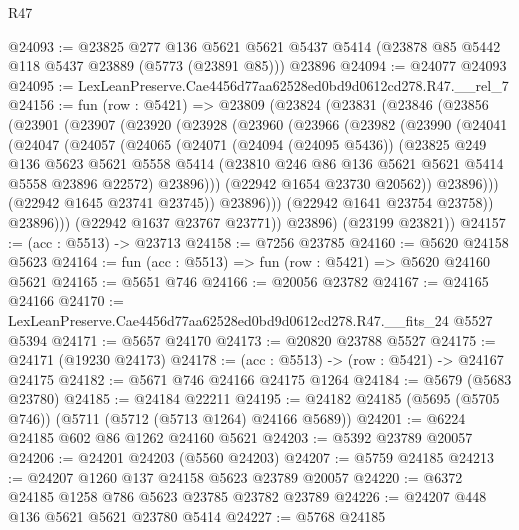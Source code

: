 \begin{lexlean}{R47}
\begin{coremodule}
@24093 := @23825
    @277
    @136
    @5621
    @5621
    @5437
    @5414
    (@23878 @85 @5442 @118 @5437 @23889 (@5773 (@23891 @85)))
    @23896
@24094 := @24077 @24093
@24095 := LexLeanPreserve.Cae4456d77aa62528ed0bd9d0612cd278.R47.__rel_7
@24156 := fun (row : @5421) =>
  @23809
    (@23824
      (@23831
        (@23846
          (@23856
            (@23901
              (@23907
                (@23920
                  (@23928
                    (@23960
                      (@23966
                        (@23982
                          (@23990
                            (@24041
                              (@24047
                                (@24057
                                  (@24065
                                    (@24071
                                      (@24094 (@24095 @5436))
                                      (@23825
                                        @249
                                        @136
                                        @5623
                                        @5621
                                        @5558
                                        @5414
                                        (@23810 @246 @86 @136 @5621 @5621 @5414 @5558 @23896 @22572)
                                        @23896)))
                                  (@22942 @1654 @23730 @20562))
                                @23896)))
                          (@22942 @1645 @23741 @23745))
                        @23896)))
                  (@22942 @1641 @23754 @23758))
                @23896)))
          (@22942 @1637 @23767 @23771))
        @23896)
      (@23199 @23821))
@24157 := (acc : @5513) -> @23713
@24158 := @7256 @23785
@24160 := @5620 @24158 @5623
@24164 := fun (acc : @5513) => fun (row : @5421) => @5620 @24160 @5621
@24165 := @5651 @746
@24166 := @20056 @23782
@24167 := @24165 @24166
@24170 := LexLeanPreserve.Cae4456d77aa62528ed0bd9d0612cd278.R47.__fits_24 @5527 @5394
@24171 := @5657 @24170
@24173 := @20820 @23788 @5527
@24175 := @24171 (@19230 @24173)
@24178 := (acc : @5513) -> (row : @5421) -> @24167 @24175
@24182 := @5671 @746 @24166 @24175 @1264
@24184 := @5679 (@5683 @23780)
@24185 := @24184 @22211
@24195 := @24182 @24185 (@5695 (@5705 @746)) (@5711 (@5712 (@5713 @1264) @24166 @5689))
@24201 := @6224 @24185 @602 @86 @1262 @24160 @5621
@24203 := @5392 @23789 @20057
@24206 := @24201 @24203 (@5560 @24203)
@24207 := @5759 @24185
@24213 := @24207 @1260 @137 @24158 @5623 @23789 @20057
@24220 := @6372 @24185 @1258 @786 @5623 @23785 @23782 @23789
@24226 := @24207 @448 @136 @5621 @5621 @23780 @5414
@24227 := @5768 @24185

\end{coremodule}
\end{lexlean}
